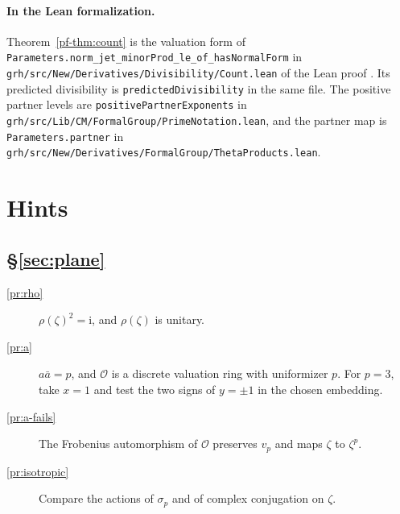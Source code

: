 \documentclass[reqno]{amsart}
\theoremstyle{definition}
\theoremstyle{plain}
\newcommand{\ii}{\mathrm{i}}
\newcommand{\Oc}{\mathcal{O}}
\begin{document}
\paragraph{In the Lean formalization.}
Theorem~\ref{pf-thm:count} is the valuation form of \texttt{Parameters.norm\_jet\_minorProd\_le\_of\_hasNormalForm} in \texttt{grh/src/New/Derivatives/Divisibility/Count.lean} of the Lean proof \cite{GL}.  Its predicted divisibility is \texttt{predictedDivisibility} in the same file.  The positive partner levels are \texttt{positivePartnerExponents} in \texttt{grh/src/Lib/CM/FormalGroup/PrimeNotation.lean}, and the partner map is \texttt{Parameters.partner} in \texttt{grh/src/New/Derivatives/FormalGroup/ThetaProducts.lean}.

\section*{Hints}

\subsection*{\S\ref{sec:plane}}
\begin{description}
\item[\ref{pr:rho}] \(\rho(\zeta)^2 = \ii\), and \(\rho(\zeta)\) is unitary.
\item[\ref{pr:a}] \(a \bar a = p\), and \(\Oc\) is a discrete valuation ring with uniformizer \(p\).  For \(p = 3\), take \(x = 1\) and test the two signs of \(y = \pm 1\) in the chosen embedding.
\item[\ref{pr:a-fails}] The Frobenius automorphism of \(\Oc\) preserves \(v_p\) and maps \(\zeta\) to \(\zeta^p\).
\item[\ref{pr:isotropic}] Compare the actions of \(\sigma_p\) and of complex conjugation on \(\zeta\).
\end{description}
\end{document}
